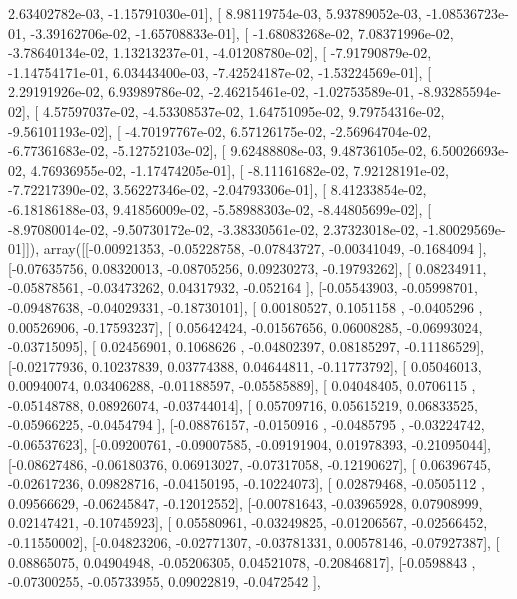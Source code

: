 \documentclass{article}
\begin{document}
          2.63402782e-03,  -1.15791030e-01],
       [  8.98119754e-03,   5.93789052e-03,  -1.08536723e-01,
         -3.39162706e-02,  -1.65708833e-01],
       [ -1.68083268e-02,   7.08371996e-02,  -3.78640134e-02,
          1.13213237e-01,  -4.01208780e-02],
       [ -7.91790879e-02,  -1.14754171e-01,   6.03443400e-03,
         -7.42524187e-02,  -1.53224569e-01],
       [  2.29191926e-02,   6.93989786e-02,  -2.46215461e-02,
         -1.02753589e-01,  -8.93285594e-02],
       [  4.57597037e-02,  -4.53308537e-02,   1.64751095e-02,
          9.79754316e-02,  -9.56101193e-02],
       [ -4.70197767e-02,   6.57126175e-02,  -2.56964704e-02,
         -6.77361683e-02,  -5.12752103e-02],
       [  9.62488808e-03,   9.48736105e-02,   6.50026693e-02,
          4.76936955e-02,  -1.17474205e-01],
       [ -8.11161682e-02,   7.92128191e-02,  -7.72217390e-02,
          3.56227346e-02,  -2.04793306e-01],
       [  8.41233854e-02,  -6.18186188e-03,   9.41856009e-02,
         -5.58988303e-02,  -8.44805699e-02],
       [ -8.97080014e-02,  -9.50730172e-02,  -3.38330561e-02,
          2.37323018e-02,  -1.80029569e-01]]), array([[-0.00921353, -0.05228758, -0.07843727, -0.00341049, -0.1684094 ],
       [-0.07635756,  0.08320013, -0.08705256,  0.09230273, -0.19793262],
       [ 0.08234911, -0.05878561, -0.03473262,  0.04317932, -0.052164  ],
       [-0.05543903, -0.05998701, -0.09487638, -0.04029331, -0.18730101],
       [ 0.00180527,  0.1051158 , -0.0405296 ,  0.00526906, -0.17593237],
       [ 0.05642424, -0.01567656,  0.06008285, -0.06993024, -0.03715095],
       [ 0.02456901,  0.1068626 , -0.04802397,  0.08185297, -0.11186529],
       [-0.02177936,  0.10237839,  0.03774388,  0.04644811, -0.11773792],
       [ 0.05046013,  0.00940074,  0.03406288, -0.01188597, -0.05585889],
       [ 0.04048405,  0.0706115 , -0.05148788,  0.08926074, -0.03744014],
       [ 0.05709716,  0.05615219,  0.06833525, -0.05966225, -0.0454794 ],
       [-0.08876157, -0.0150916 , -0.0485795 , -0.03224742, -0.06537623],
       [-0.09200761, -0.09007585, -0.09191904,  0.01978393, -0.21095044],
       [-0.08627486, -0.06180376,  0.06913027, -0.07317058, -0.12190627],
       [ 0.06396745, -0.02617236,  0.09828716, -0.04150195, -0.10224073],
       [ 0.02879468, -0.0505112 ,  0.09566629, -0.06245847, -0.12012552],
       [-0.00781643, -0.03965928,  0.07908999,  0.02147421, -0.10745923],
       [ 0.05580961, -0.03249825, -0.01206567, -0.02566452, -0.11550002],
       [-0.04823206, -0.02771307, -0.03781331,  0.00578146, -0.07927387],
       [ 0.08865075,  0.04904948, -0.05206305,  0.04521078, -0.20846817],
       [-0.0598843 , -0.07300255, -0.05733955,  0.09022819, -0.0472542 ],
\end{document}
